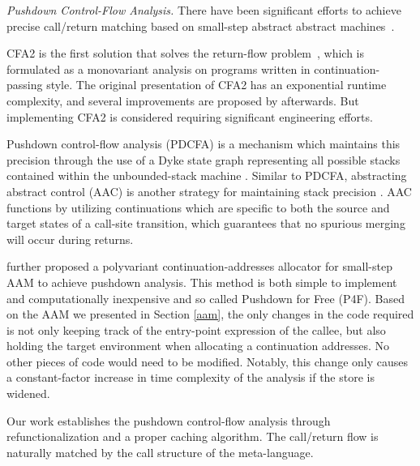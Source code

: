 \documentclass[acmsmall, screen]{acmart}\settopmatter{}
\begin{document}
\textit{Pushdown Control-Flow Analysis.}
There have been significant efforts to achieve precise call/return matching
based on small-step abstract abstract machines~\cite{vardoulakis2010cfa2, earl2012introspective,
gilray2016pushdown, johnson2015abstracting}.

CFA2 is the first solution that solves the return-flow problem~\cite{vardoulakis2010cfa2},
which is formulated as a monovariant analysis on programs written in continuation-passing style.
The original presentation of CFA2 has an exponential runtime complexity, 
and several improvements are proposed by \citet{vardoulakis-diss12} afterwards.
But implementing CFA2 is considered requiring significant engineering efforts.

Pushdown control-flow analysis (PDCFA) is a mechanism which maintains this precision through
the use of a Dyke state graph representing all possible stacks contained within the unbounded-stack
machine \cite{earl2012introspective, earl2010pushdown}. Similar to PDCFA, abstracting abstract
control (AAC) is another strategy for maintaining stack precision \cite{johnson2015abstracting}.
AAC functions by utilizing continuations which are specific to both the source and target states
of a call-site transition, which guarantees that no spurious merging will occur during returns.

 further proposed a polyvariant continuation-addresses allocator
for small-step AAM to achieve pushdown analysis. This method is both
simple to implement and computationally inexpensive and so called Pushdown for Free (P4F).
Based on the AAM we presented in Section \ref{aam}, the only changes in the code required is not
only keeping track of the entry-point expression of the callee, but also holding the target
environment when allocating a continuation addresses. No other pieces of code would need to be
modified. Notably, this change only causes a constant-factor increase in time complexity of
the analysis if the store is widened.

Our work establishes the pushdown control-flow analysis through refunctionalization and a
proper caching algorithm. The call/return flow is naturally matched by the call structure
of the meta-language. \\
\end{document}
